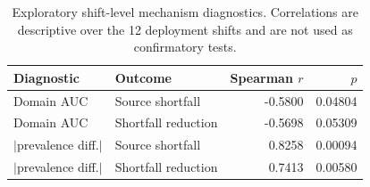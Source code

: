 \begin{table}[!tbp]
\centering
\caption{Exploratory shift-level mechanism diagnostics. Correlations are descriptive over the 12 deployment shifts and are not used as confirmatory tests.}
\label{tab:mechanism_correlation}
\footnotesize
\begin{tabular}{llrr}
\toprule
Diagnostic & Outcome & Spearman $r$ & $p$ \\
\midrule
Domain AUC & Source shortfall & -0.5800 & 0.04804 \\
Domain AUC & Shortfall reduction & -0.5698 & 0.05309 \\
$|$prevalence diff.$|$ & Source shortfall & 0.8258 & 0.00094 \\
$|$prevalence diff.$|$ & Shortfall reduction & 0.7413 & 0.00580 \\
\bottomrule
\end{tabular}
\end{table}
